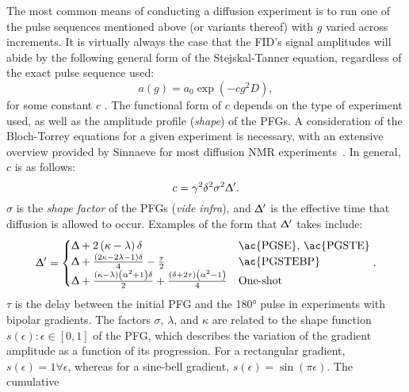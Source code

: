 The most common means of conducting a diffusion experiment is to run one of the
pulse sequences mentioned above (or variants thereof) with $g$ varied across
increments.
It is virtually always the case that the \ac{FID}'s signal amplitudes will
abide by the following general form of the Stejskal-Tanner equation,
regardless of the exact pulse sequence used:
\begin{equation}
    a(g) = a_0 \exp\left(- c g^2 D\right),
\end{equation}
for some constant $c$ \correction{(\unit{\second\per\tesla\squared})}\label{corr:c-unit}.
The functional form of $c$ depends on the type of experiment used, as well as
the amplitude profile (\emph{shape}) of the \acp{PFG}.
A consideration of the Bloch-Torrey equations for a given experiment is
necessary, with an extensive overview provided by Sinnaeve for most diffusion
NMR experiments~\cite{Sinnaeve2012}. In general, $c$ is as follows:
\begin{equation}
    c = \gamma^2 \delta^2 \sigma^2 \Updelta^{\prime}.
    \label{eq:stejskal_tanner_generic}
\end{equation}
$\sigma$ is the \emph{shape factor} of the \acp{PFG} (\textit{vide infra}),
and $\Updelta^{\prime}$ is the effective time that diffusion is allowed
to occur. Examples of the form that $\Updelta^{\prime}$ takes include:
\begin{equation}
    \Updelta^{\prime} =
    \begin{cases}
        \Updelta + 2 \left(\kappa - \lambda\right) \delta &
        \text{\ac{PGSE}, \ac{PGSTE}}\\
        \Updelta + \frac{\left(2 \kappa - 2 \lambda - 1\right)\delta}{4} - \frac{\tau}{2} &
        \text{\ac{PGSTEBP}} \\
        \Updelta + \frac{\left(\kappa - \lambda\right)
            \left(\alpha^2 + 1\right) \delta}{2} +
        \frac{\left(\delta + 2 \tau\right)\left(\alpha^2 - 1\right)}{4} &
        \text{One-shot}
    \end{cases}.
    \label{eq:Delta-prime}
\end{equation}
$\tau$ is the delay between the initial \ac{PFG} and the \ang{180} pulse in
experiments with bipolar gradients.
The factors $\sigma$,  $\lambda$, and $\kappa$ are related to the shape
function $s(\epsilon) : \epsilon \in [0, 1]$ of the \ac{PFG}, which describes
the variation of the gradient amplitude as a function of its progression.
For a rectangular gradient, $s(\epsilon) = 1 \forall \epsilon$, whereas for a
sine-bell gradient, $s(\epsilon) = \sin(\pi \epsilon)$. The cumulative
